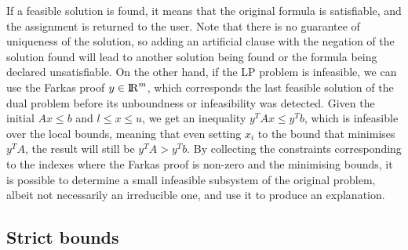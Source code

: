 \documentclass[runningheads]{llncs}
\begin{document}
If a feasible solution is found, it means that the original formula is satisfiable, and the assignment is returned to the user.
Note that there is no guarantee of uniqueness of the solution, so adding an artificial clause with the negation of the solution found will lead to another solution being found or the formula being declared unsatisfiable.
On the other hand, if the LP problem is infeasible, we can use the Farkas proof $y \in {\rm I\!R}^m$, which corresponds the last feasible solution of the dual problem before its unboundness or infeasibility was detected.
Given the initial  $Ax \le b$ and $l \le x \le u$, we get an inequality $y^T A x \le y^T b$, which is infeasible over the local bounds, meaning that even setting $x_i$ to the bound that minimises $y^T A$, the result will still be $y^T A > y^T b$.
By collecting the constraints corresponding to the indexes where the Farkas proof is non-zero and the minimising bounds, it is possible to determine a small infeasible subsystem of the original problem, albeit not necessarily an irreducible one, and use it to produce an explanation.

\subsection{Strict bounds}
\label{sec:strict-bounds}
\end{document}
